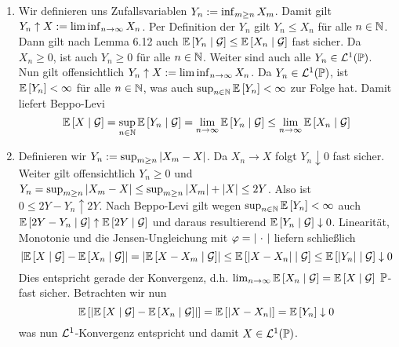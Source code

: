 \begin{exercisePage}
	\begin{enumerate}[wide, leftmargin=*, label=(zu \alph*)]
		\item Wir definieren uns Zufallsvariablen $Y_n \defeq \inf_{m \ge n} X_m$. Damit gilt $Y_n \uparrow X \defeq \liminf_{n \to \infty} X_n$. Per Definition der $Y_n$ gilt $Y_n \le X_n$ für alle $n \in \N$. Dann gilt nach Lemma 6.12 auch $\EW[Y_n \mid \mathG] \le \EW[X_n \mid \mathG]$ fast sicher. Da $X_n \ge 0$, ist auch $Y_n \ge 0$ für alle $n \in \N$. Weiter sind auch alle $Y_n \in \L^1(\P)$. Nun gilt offensichtlich $Y_n \uparrow X \defeq \liminf_{n \to \infty} X_n$. Da $Y_n \in \L^1(\P)$, ist $\EW[Y_n] < \infty$ für alle $n \in \N$, was auch $\sup_{n \in \N} \EW[Y_n] < \infty$ zur Folge hat. Damit liefert Beppo-Levi
		\begin{equation*}
			\EW[X \mid \mathG] = \sup_{n \in \N} \EW[Y_n \mid \mathG] = \lim_{n \to \infty} \EW[Y_n \mid \mathG] \le \lim_{n \to \infty} \EW[X_n \mid \mathG]
		\end{equation*}
		\item Definieren wir $Y_n \defeq \sup_{m \ge n} \abs{X_m - X}$. Da $X_n \to X$ folgt $Y_n \downarrow 0$ fast sicher. Weiter gilt offensichtlich $Y_n \ge 0$ und $Y_n = \sup_{m \ge n} \abs{X_m - X} \le \sup_{m \ge n} \abs{X_m} + \abs{X} \le 2Y$. Also ist $0 \le 2Y - Y_n \uparrow 2Y$. Nach Beppo-Levi gilt wegen $\sup_{n \in \N} \EW[Y_n] < \infty$ auch $\EW[2Y - Y_n \mid \mathG] \uparrow \EW[2Y \mid \mathG]$ und daraus resultierend $\EW[Y_n \mid \mathG] \downarrow 0$. Linearität, Monotonie und die Jensen-Ungleichung mit $\phi = \abs{\ \cdot \ }$ liefern schließlich
		\begin{equation*}
			\abs{\EW[X \mid \mathG] - \EW[X_n \mid \mathG]} = \abs{\EW[X - X_m \mid \mathG]} \le \EW[\abs{X - X_n} \mid \mathG] \le \EW[\abs{Y_n} \mid \mathG] \downarrow 0
		\end{equation*}
		Dies entspricht gerade der Konvergenz, d.h. $\lim_{n \to \infty} \EW[X_n \mid \mathG] = \EW[X \mid \mathG]$ $\P$-fast sicher. Betrachten wir nun
		\begin{equation*}
			\EW[\abs{\EW[X \mid \mathG] - \EW[X_n \mid \mathG]}] = \EW[\abs{X - X_n}] = \EW[Y_n] \downarrow 0
		\end{equation*}
		was nun $\L^1$-Konvergenz entspricht und damit $X \in \L^1(\P)$.
	\end{enumerate}


\end{exercisePage}
